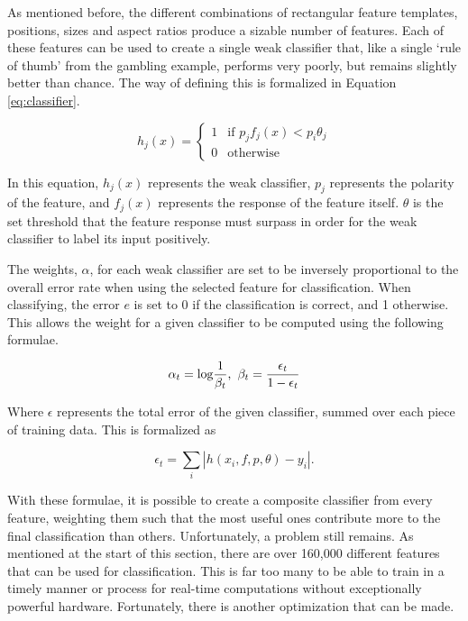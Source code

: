 \documentclass[11pt,a4paper,oldfontcommands]{memoir}
\begin{document}
As mentioned before, the different combinations of rectangular feature templates, positions, sizes and aspect ratios produce a sizable number of features. Each of these features can be used to create a single weak classifier that, like a single `rule of thumb' from the gambling example, performs very poorly, but remains slightly better than chance. The way of defining this is formalized in Equation \ref{eq:classifier}.

\begin{equation}
    h_j(x) = 
    \begin{cases} 
        1 & \textrm{if  } p_j f_j(x) < p_i\theta_j \\ 
        0 & \textrm{otherwise}
    \end{cases}
    \label{eq:classifier}
\end{equation}

In this equation, $h_j(x)$ represents the weak classifier, $p_j$ represents the polarity of the feature, and $f_j(x)$ represents the response of the feature itself. $\theta$ is the set threshold that the feature response must surpass in order for the weak classifier to label its input positively.


The weights, $\alpha$, for each weak classifier are set to be inversely proportional to the overall error rate when using the selected feature for classification. When classifying, the error $e$ is set to 0 if the classification is correct, and 1 otherwise. This allows the weight for a given classifier to be computed using the following formulae.

\begin{equation}
    \alpha_t = \textrm{log}\frac{1}{\beta_t} \textrm{,\phantom{x}}
    \beta_t = \frac{\epsilon_t}{1-\epsilon_t}
\end{equation}

Where $\epsilon$ represents the total error of the given classifier, summed over each piece of training data. This is formalized as

\begin{equation}
    \epsilon_t = \sum\limits_{i} |h(x_i, f, p, \theta) - y_i| .
\end{equation}

With these formulae, it is possible to create a composite classifier from every feature, weighting them such that the most useful ones contribute more to the final classification than others. Unfortunately, a problem still remains. As mentioned at the start of this section, there are over 160,000 different features that can be used for classification. This is far too many to be able to train in a timely manner or process for real-time computations without exceptionally powerful hardware. Fortunately, there is another optimization that can be made. 
\end{document}
